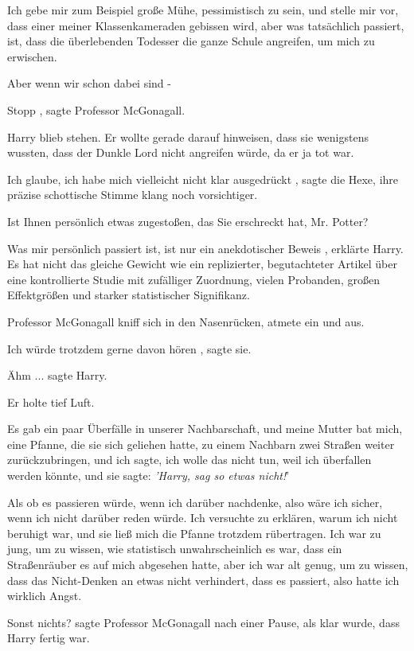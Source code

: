 Ich gebe mir zum Beispiel große Mühe, pessimistisch zu sein, und stelle mir vor,
dass einer meiner Klassenkameraden gebissen wird, aber was tatsächlich
passiert, ist, dass die überlebenden Todesser die ganze Schule angreifen, um
mich zu erwischen.

Aber wenn wir schon dabei sind -\grqq{}

\glqq Stopp\grqq{} , sagte Professor McGonagall.

Harry blieb stehen. Er wollte gerade darauf hinweisen, dass sie wenigstens
wussten, dass der Dunkle Lord nicht angreifen würde, da er ja tot war.

\glqq Ich glaube, ich habe mich vielleicht nicht klar ausgedrückt\grqq{} , sagte
die Hexe, ihre präzise schottische Stimme klang noch vorsichtiger.

\glqq Ist Ihnen persönlich etwas zugestoßen, das Sie erschreckt hat, Mr.
Potter?\grqq{}

\glqq Was mir persönlich passiert ist, ist nur ein anekdotischer Beweis\grqq{} ,
erklärte Harry. \glqq Es hat nicht das gleiche Gewicht wie ein replizierter,
begutachteter Artikel über eine kontrollierte Studie mit zufälliger
Zuordnung, vielen Probanden, großen Effektgrößen und starker statistischer
Signifikanz.\grqq{}

Professor McGonagall kniff sich in den Nasenrücken, atmete ein und aus.

\glqq Ich würde trotzdem gerne davon hören\grqq{} , sagte sie.

\glqq Ähm ...\grqq{} sagte Harry.

Er holte tief Luft.

\glqq Es gab ein paar Überfälle in unserer Nachbarschaft, und meine Mutter bat
mich, eine Pfanne, die sie sich geliehen hatte, zu einem Nachbarn zwei
Straßen weiter zurückzubringen, und ich sagte, ich wolle das nicht tun, weil
ich überfallen werden könnte, und sie sagte: \emph{'Harry, sag so etwas
nicht!}'

Als ob es passieren würde, wenn ich darüber nachdenke, also wäre ich sicher,
wenn ich nicht darüber reden würde. Ich versuchte zu erklären, warum ich
nicht beruhigt war, und sie ließ mich die Pfanne trotzdem rübertragen. Ich
war zu jung, um zu wissen, wie statistisch unwahrscheinlich es war, dass ein
Straßenräuber es auf mich abgesehen hatte, aber ich war alt genug, um zu
wissen, dass das Nicht-Denken an etwas nicht verhindert, dass es passiert,
also hatte ich wirklich Angst.\grqq{}

\glqq Sonst nichts?\grqq{} sagte Professor McGonagall nach einer Pause, als klar
wurde, dass Harry fertig war.

